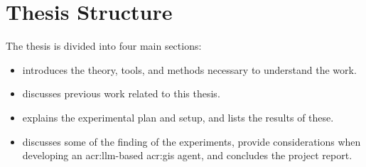 \section{Thesis Structure}
\label{sec:thesisStructure}

The thesis is divided into four main sections:
\begin{itemize}
    \item {} introduces the theory, tools, and methods necessary to understand the work.
    \item {} discusses previous work related to this thesis.
    \item {} explains the experimental plan and setup, and lists the results of these.
    \item {} discusses some of the finding of the experiments, provide considerations when developing an \acrshort{acr:llm}-based \acrshort{acr:gis} agent, and concludes the project report.
\end{itemize}

\glsresetall